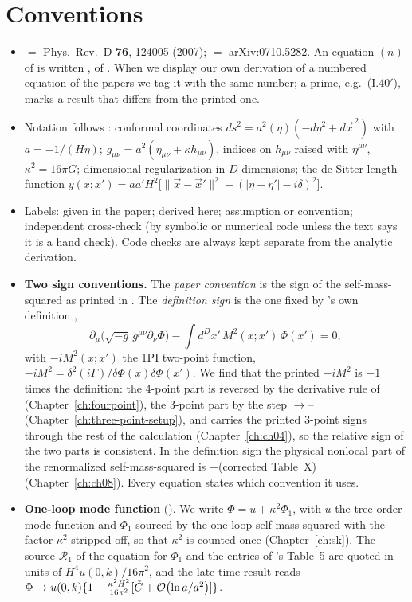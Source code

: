 \documentclass[11pt]{report}
\numberwithin{equation}{chapter}
\begin{document}
\section*{Conventions}
\begin{itemize}[leftmargin=14pt]
\item \PI{} $=$ Phys.\ Rev.\ D \textbf{76}, 124005 (2007); \PII{} $=$ arXiv:0710.5282. An equation $(n)$ of \PI{} is written , of \PII{} .
When we display our own derivation of a numbered equation of the papers we tag it with the same number; a prime, e.g.\ (I.40$'$), marks a result that differs from the printed one.
\item Notation follows \PI: conformal coordinates $ds^2=a^2(\eta)(-d\eta^2+d\vec x^{\,2})$ with $a=-1/(H\eta)$; $g_{\mu\nu}=a^2(\eta_{\mu\nu}+\kappa h_{\mu\nu})$, indices on $h_{\mu\nu}$ raised with $\eta^{\mu\nu}$, $\kappa^2=16\pi G$;
dimensional regularization in $D$ dimensions; the de Sitter length function $y(x;x')=aa'H^2\big[\|\vec x-\vec x'\|^2-(|\eta-\eta'|-i\delta)^2\big]$.
\item Labels: \tP{} given in the paper; \tD{} derived here; \tA{} assumption or convention; \tC{} independent cross-check (by symbolic or numerical code unless the text says it is a hand check). Code checks are always kept separate from the analytic derivation.
\item \textbf{Two sign conventions.} The \emph{paper convention} is the sign of the self-mass-squared as printed in \PI. The \emph{definition sign} is the one fixed by \PI's own definition ,
\[
\partial_\mu\big(\sqrt{-g}\,g^{\mu\nu}\partial_\nu\Phi\big)-\int d^Dx'\,M^2(x;x')\,\Phi(x')=0 ,
\]
with $-iM^2(x;x')$ the 1PI two-point function, $-iM^2=\delta^2(i\Gamma)/\delta\Phi(x)\delta\Phi(x')$.
We find that the printed $-iM^2$ is $-1$ times the definition: the 4-point part is reversed by the derivative rule of  (Chapter~\ref{ch:fourpoint}),
the 3-point part by the step $\to$-- (Chapter~\ref{ch:three-point-setup}), and \PI{} carries the printed 3-point signs through the rest of the
calculation (Chapter~\ref{ch:ch04}), so the relative sign of the two parts is consistent. In the definition sign the physical nonlocal part of the renormalized
self-mass-squared is $-$(corrected Table~X) (Chapter~\ref{ch:ch08}). Every equation states which convention it uses.
\item \textbf{One-loop mode function} (\PII). We write $\Phi=u+\kappa^2\Phi_1$, with $u$ the tree-order mode function and $\Phi_1$ sourced by the one-loop
self-mass-squared with the factor $\kappa^2$ stripped off, so that $\kappa^2$ is counted once (Chapter~\ref{ch:sk}). The source $\mathcal R_1$ of the
equation for $\Phi_1$ and the entries of \PII's Table~5 are quoted in units of $H^4u(0,k)/16\pi^2$, and the late-time result reads
$\Phi\to u(0,k)\{1+\frac{\kappa^2H^2}{16\pi^2}[\tilde C+\mathcal{O}\!\left(\ln a/a^2\right)]\}$.
\end{itemize}
\end{document}

